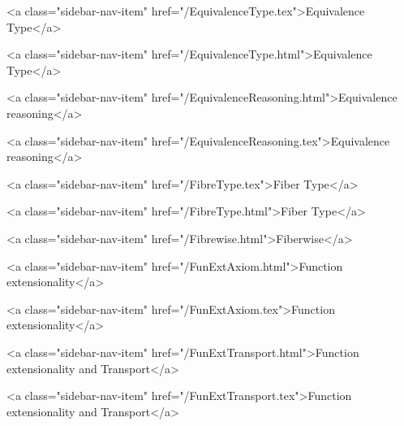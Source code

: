       
    
      
        
          <a class="sidebar-nav-item" href="/EquivalenceType.tex">Equivalence Type</a>
        
      
    
      
        
          <a class="sidebar-nav-item" href="/EquivalenceType.html">Equivalence Type</a>
        
      
    
      
        
          <a class="sidebar-nav-item" href="/EquivalenceReasoning.html">Equivalence reasoning</a>
        
      
    
      
        
          <a class="sidebar-nav-item" href="/EquivalenceReasoning.tex">Equivalence reasoning</a>
        
      
    
      
        
          <a class="sidebar-nav-item" href="/FibreType.tex">Fiber Type</a>
        
      
    
      
        
          <a class="sidebar-nav-item" href="/FibreType.html">Fiber Type</a>
        
      
    
      
        
          <a class="sidebar-nav-item" href="/Fibrewise.html">Fiberwise</a>
        
      
    
      
        
          <a class="sidebar-nav-item" href="/FunExtAxiom.html">Function extensionality</a>
        
      
    
      
        
          <a class="sidebar-nav-item" href="/FunExtAxiom.tex">Function extensionality</a>
        
      
    
      
        
          <a class="sidebar-nav-item" href="/FunExtTransport.html">Function extensionality and Transport</a>
        
      
    
      
        
          <a class="sidebar-nav-item" href="/FunExtTransport.tex">Function extensionality and Transport</a>
        
